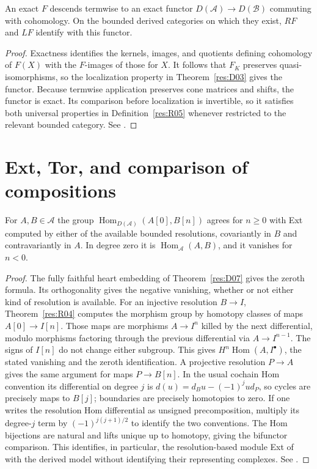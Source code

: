 \begin{proposition}\label{res:R10}
An exact \(F\) descends termwise to an exact functor \(D(\mathcal A)\to D(\mathcal B)\)
commuting with cohomology. On the bounded derived categories on which
they exist, \(RF\) and \(LF\) identify with this functor.
\end{proposition}
\begin{proof}
Exactness identifies the kernels, images, and quotients defining
cohomology of \(F(X)\) with the \(F\)-images of those for \(X\).
It follows that \(F_K\) preserves quasi-isomorphisms, so the localization
property in Theorem~\ref{res:D03} gives the functor. Because
termwise application preserves cone matrices and shifts, the functor is
exact. Its comparison before localization is invertible, so it satisfies
both universal properties in Definition~\ref{res:R05} whenever
restricted to the relevant bounded category. See
\cite[Tag 015F]{stacks-derived}.
\end{proof}

\section{Ext, Tor, and comparison of compositions}

\begin{theorem}\label{res:R11}
For \(A,B\in\mathcal A\) the group
\(\operatorname{Hom}_{D(\mathcal A)}(A[0],B[n])\) agrees for \(n\ge0\)
with Ext computed by either of the available bounded resolutions,
covariantly in \(B\) and contravariantly in \(A\).
In degree zero it is \(\operatorname{Hom}_{\mathcal A}(A,B)\), and
it vanishes for \(n<0\).
\end{theorem}
\begin{proof}
The fully faithful heart embedding of Theorem~\ref{res:D07} gives
the zeroth formula. Its orthogonality gives the negative vanishing,
whether or not either kind of resolution is available.
For an injective resolution \(B\to I\), Theorem~\ref{res:R04}
computes the morphism group by homotopy classes of maps \(A[0]\to I[n]\).
Those maps are morphisms \(A\to I^n\) killed by the next differential,
modulo morphisms factoring through the previous differential via
\(A\to I^{n-1}\). The signs of \(I[n]\) do not change either subgroup.
This gives \(H^n\operatorname{Hom}(A,I^\bullet)\), the stated vanishing
and the zeroth identification. A projective resolution \(P\to A\) gives
the same argument for maps \(P\to B[n]\). In the usual cochain Hom
convention its differential on degree \(j\) is
\(d(u)=d_B u-(-1)^j u d_P\), so cycles are precisely maps to \(B[j]\);
boundaries are precisely homotopies to zero. If one writes the
resolution Hom differential as unsigned precomposition, multiply
its degree-\(j\) term by \((-1)^{j(j+1)/2}\) to identify the two
conventions. The Hom bijections are natural and lifts unique up to
homotopy, giving the bifunctor comparison. This identifies, in
particular, the resolution-based module Ext of \cite[Chapter 11]{p103}
with the derived model without identifying their representing complexes.
See \cite[Tags 06XQ--06XS]{stacks-derived}.
\end{proof}

